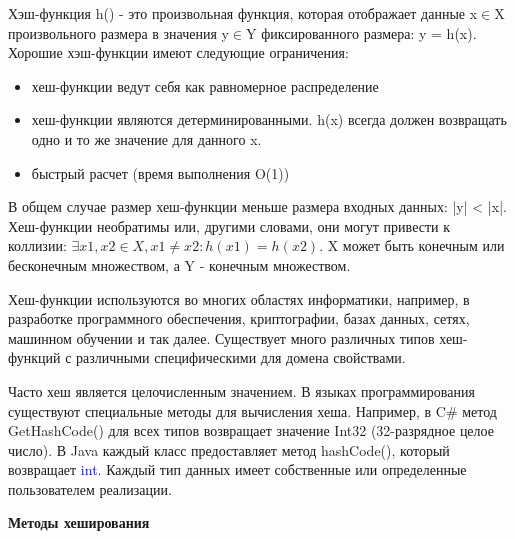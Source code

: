 Хэш-функция { h()} - это произвольная функция, которая отображает данные { x$\in$X} произвольного размера в значения { y$\in$Y} фиксированного размера: { y = h(x)}. Хорошие хэш-функции имеют следующие ограничения:

\begin{itemize}
    \item хеш-функции ведут себя как равномерное распределение
    \item хеш-функции являются детерминированными. { h(x)} всегда должен возвращать одно и то же значение для данного { x}.
    \item быстрый расчет (время выполнения O(1))
\end{itemize}

В общем случае размер хеш-функции меньше размера входных данных: { |y| < |x|}. Хеш-функции необратимы или, другими словами, они могут привести к коллизии: $\exists x1,x2\in X, x1 \neq x2: h(x1) = h(x2)$. { X} может быть конечным или бесконечным множеством, а { Y} - конечным множеством.

\vspace{\baselineskip}

Хеш-функции используются во многих областях информатики, например, в разработке программного обеспечения, криптографии, базах данных, сетях, машинном обучении и так далее. Существует много различных типов хеш-функций с различными специфическими для домена свойствами.

\vspace{\baselineskip}

Часто хеш является целочисленным значением. В языках программирования существуют специальные методы для вычисления хеша. Например, в {C\#} метод { GetHashCode()} для всех типов возвращает значение {Int32} (32-разрядное целое число). В {Java} каждый класс предоставляет метод {hashCode()}, который возвращает { \textcolor{blue}{int}}. Каждый тип данных имеет собственные или определенные пользователем реализации.

\vspace{\baselineskip}

\textbf{Методы хеширования}


